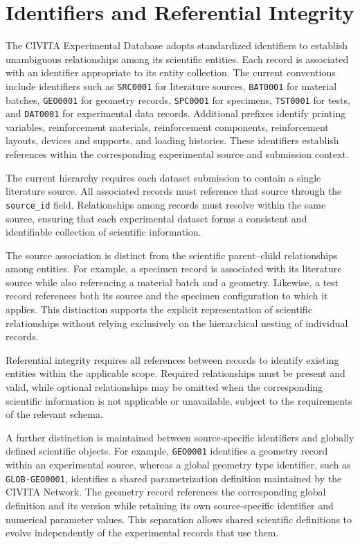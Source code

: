 \section{Identifiers and Referential Integrity}

The CIVITA Experimental
Database adopts standardized
identifiers to establish
unambiguous relationships
among its scientific entities.
Each record is associated
with an identifier
appropriate to its
entity collection.
The current conventions
include identifiers
such as \texttt{SRC0001}
for literature sources,
\texttt{BAT0001}
for material batches,
\texttt{GEO0001}
for geometry records,
\texttt{SPC0001}
for specimens,
\texttt{TST0001}
for tests, and
\texttt{DAT0001}
for experimental
data records.
Additional prefixes
identify printing
variables, reinforcement
materials, reinforcement
components, reinforcement
layouts, devices and
supports, and loading
histories.
These identifiers
establish references
within the corresponding
experimental source
and submission context.

The current hierarchy
requires each dataset
submission to contain
a single literature
source. All associated
records must reference
that source through
the \texttt{source\_id}
field.
Relationships among
records must resolve
within the same source,
ensuring that each
experimental dataset
forms a consistent
and identifiable
collection of
scientific information.

The source association
is distinct from the
scientific parent--child
relationships among
entities.
For example, a
specimen record is
associated with its
literature source
while also referencing
a material batch
and a geometry.
Likewise, a test
record references
both its source
and the specimen
configuration to
which it applies.
This distinction
supports the explicit
representation of
scientific relationships
without relying
exclusively on the
hierarchical nesting
of individual records.

Referential integrity
requires all references
between records to
identify existing
entities within
the applicable
scope.
Required relationships
must be present
and valid, while
optional relationships
may be omitted when
the corresponding
scientific information
is not applicable
or unavailable,
subject to the
requirements of
the relevant schema.

A further distinction
is maintained between
source-specific
identifiers and
globally defined
scientific objects.
For example,
\texttt{GEO0001}
identifies a geometry
record within an
experimental source,
whereas a global
geometry type
identifier, such
as \texttt{GLOB-GEO0001},
identifies a shared
parametrization
definition maintained
by the CIVITA Network.
The geometry record
references the
corresponding global
definition and its
version while retaining
its own source-specific
identifier and numerical
parameter values.
This separation
allows shared
scientific definitions
to evolve independently
of the experimental
records that use them.

